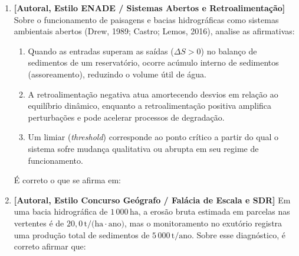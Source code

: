 \begin{enumerate}[leftmargin=1.8em, itemsep=6pt]
  \item \textbf{[Autoral, Estilo ENADE / Sistemas Abertos e Retroalimentação]} Sobre o funcionamento de paisagens e bacias hidrográficas como sistemas ambientais abertos (Drew, 1989; Castro; Lemos, 2016), analise as afirmativas:
  \begin{enumerate}[label=\Roman*., leftmargin=2.0em, itemsep=2pt]
    \item Quando as entradas superam as saídas ($\Delta S > 0$) no balanço de sedimentos de um reservatório, ocorre acúmulo interno de sedimentos (assoreamento), reduzindo o volume útil de água.
    \item A retroalimentação negativa atua amortecendo desvios em relação ao equilíbrio dinâmico, enquanto a retroalimentação positiva amplifica perturbações e pode acelerar processos de degradação.
    \item Um limiar (\textit{threshold}) corresponde ao ponto crítico a partir do qual o sistema sofre mudança qualitativa ou abrupta em seu regime de funcionamento.
  \end{enumerate}
  É correto o que se afirma em:
  \espacoResolucao[1.1cm]

  \item \textbf{[Autoral, Estilo Concurso Geógrafo / Falácia de Escala e SDR]} Em uma bacia hidrográfica de $1\,000\,\text{ha}$, a erosão bruta estimada em parcelas nas vertentes é de $20{,}0\,\text{t/(ha}\cdot\text{ano)}$, mas o monitoramento no exutório registra uma produção total de sedimentos de $5\,000\,\text{t/ano}$. Sobre esse diagnóstico, é correto afirmar que:
  \espacoResolucao[1.4cm]


\end{enumerate}

